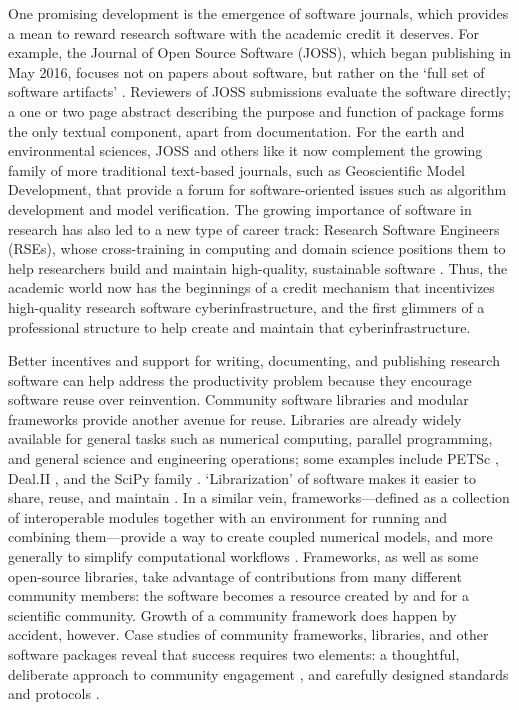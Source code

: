 \documentclass[12pt]{amsart}
\begin{document}
One promising development is the emergence of software journals, which provides a mean to reward research software with the academic credit it deserves. For example, the Journal of Open Source Software (JOSS), which began publishing in May 2016, focuses not on papers about software, but rather on the `full set of software artifacts' \citep{smith2018journal}. Reviewers of JOSS submissions evaluate the software directly; a one or two page abstract describing the purpose and function of package forms the only textual component, apart from documentation. For the earth and environmental sciences, JOSS and others like it now complement the growing family of more traditional text-based journals, such as Geoscientific Model Development, that provide a forum for software-oriented issues such as algorithm development and model verification. The growing importance of software in research has also led to a new type of career track: Research Software Engineers (RSEs), whose cross-training in computing and domain science positions them to help researchers build and maintain high-quality, sustainable software \citep{baxter2012research}. Thus, the academic world now has the beginnings of a credit mechanism that incentivizes high-quality research software cyberinfrastructure, and the first glimmers of a professional structure to help create and maintain that cyberinfrastructure. 

Better incentives and support for writing, documenting, and publishing research software can help address the productivity problem because they encourage software reuse over reinvention. Community software libraries and modular frameworks provide another avenue for reuse. Libraries are already widely available for general tasks such as numerical computing, parallel programming, and general science and engineering operations; some examples include PETSc \citep{abhyankar2018petsc}, Deal.II \citep{bangerth2007deal}, and the SciPy family \citep{2020SciPy-NMeth}. `Librarization' of software makes it easier to share, reuse, and maintain \citep{brown2014run}. In a similar vein, frameworks---defined as a collection of interoperable modules together with an environment for running and combining them---provide a way to create coupled numerical models, and more generally to simplify computational workflows \citep[e.g.,][]{leavesley1996modular,voinov2004modular,peckham2013component}. Frameworks, as well as some open-source libraries, take advantage of contributions from many different community members: the software becomes a resource created by and for a scientific community. Growth of a community framework does happen by accident, however. Case studies of community frameworks, libraries, and other software packages reveal that success requires two elements: a thoughtful, deliberate approach to community engagement \citep{bangerth2013makes,turk2013scaling,lawrence2015science}, and carefully designed standards and protocols \citep{peckham2013component,harpham2019introductory}.
\end{document}
